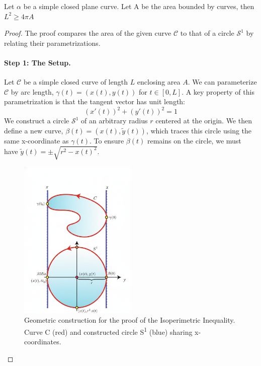 \documentclass{article}
\begin{document}
\begin{theorem}
    Let $\alpha$ be a simple closed plane curve. Let A be the area bounded by curves, then $L^2\geq 4\pi A$
\end{theorem}
\begin{proof}
The proof compares the area of the given curve $\mathcal{C}$ to that of a circle $\mathcal{S}^1$ by relating their parametrizations.

\paragraph{Step 1: The Setup.}
Let $\mathcal{C}$ be a simple closed curve of length $L$ enclosing area $A$. We can parameterize $\mathcal{C}$ by arc length, $\gamma(t) = (x(t), y(t))$ for $t \in [0, L]$. A key property of this parametrization is that the tangent vector has unit length:
\[ (x'(t))^2 + (y'(t))^2 = 1 \]
We construct a circle $\mathcal{S}^1$ of an arbitrary radius $r$ centered at the origin. We then define a new curve, $\beta(t) = (x(t), \tilde{y}(t))$, which traces this circle using the same x-coordinate as $\gamma(t)$. To ensure $\beta(t)$ remains on the circle, we must have $\tilde{y}(t) = \pm\sqrt{r^2 - x(t)^2}$.
\begin{figure}[h!]
    \centering
    \includegraphics[width=0.5\textwidth]{isoperimetric_proof.png} %
    \caption{Geometric construction for the proof of the Isoperimetric Inequality.
             Curve C (red) and constructed circle S\textsuperscript{1} (blue) sharing x-coordinates.}
    \label{fig:isoperimetric_proof}
\end{figure}


\end{proof}
\end{document}
